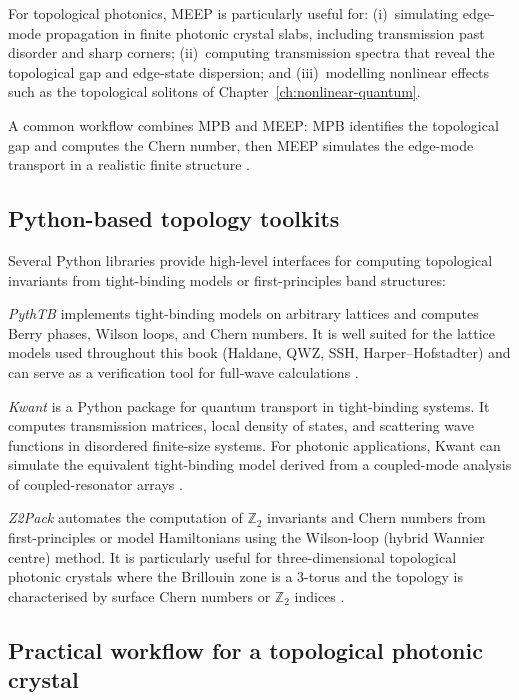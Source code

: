 For topological photonics, MEEP is particularly useful for:
(i)~simulating edge-mode propagation in finite photonic crystal
slabs, including transmission past disorder and sharp corners;
(ii)~computing transmission spectra that reveal the topological gap
and edge-state dispersion; and (iii)~modelling nonlinear effects
such as the topological solitons of
Chapter~\ref{ch:nonlinear-quantum}.

A common workflow combines MPB and MEEP: MPB identifies the
topological gap and computes the Chern number, then MEEP simulates
the edge-mode transport in a realistic finite structure
\cite{ozawa2018topological,paz2019tutorial}.

\subsection{Python-based topology toolkits}
\label{sec:appC-python-toolkits}

Several Python libraries provide high-level interfaces for computing
topological invariants from tight-binding models or first-principles
band structures:

\emph{PythTB} implements tight-binding models on arbitrary lattices
and computes Berry phases, Wilson loops, and Chern numbers.  It is
well suited for the lattice models used throughout this book
(Haldane, QWZ, SSH, Harper--Hofstadter) and can serve as a
verification tool for full-wave calculations
\cite{asbth2016berry,paz2019tutorial}.

\emph{Kwant} is a Python package for quantum transport in
tight-binding systems.  It computes transmission matrices, local
density of states, and scattering wave functions in disordered
finite-size systems.  For photonic applications, Kwant can simulate
the equivalent tight-binding model derived from a coupled-mode
analysis of coupled-resonator arrays
\cite{ozawa2018topological}.

\emph{Z2Pack} automates the computation of $\mathbb{Z}_2$ invariants
and Chern numbers from first-principles or model Hamiltonians using
the Wilson-loop (hybrid Wannier centre) method.  It is particularly
useful for three-dimensional topological photonic crystals where
the Brillouin zone is a 3-torus and the topology is characterised
by surface Chern numbers or $\mathbb{Z}_2$ indices
\cite{asbth2016berry}.

\subsection{Practical workflow for a topological photonic crystal}
\label{sec:appC-workflow-topology}

